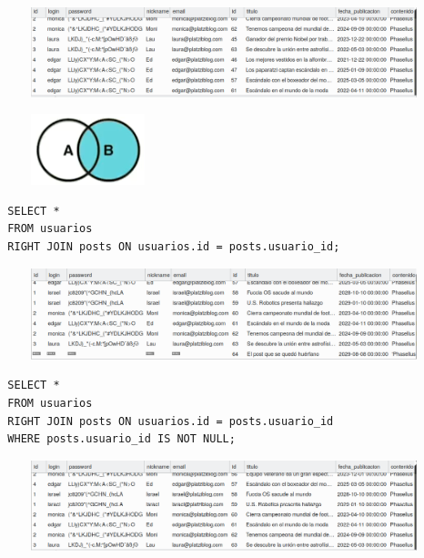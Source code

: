 \documentclass{article}
\begin{document}
\begin{figure}[h!]
  \centering
  \includegraphics[scale=0.75]{./Pictures/093_join_left_not_null.png}
\end{figure}


\begin{figure}[h!]
  \centering
  \includegraphics[scale=0.75]{./Pictures/091_join_right.png}
\end{figure}

\begin{verbatim}
  SELECT *
  FROM usuarios
  RIGHT JOIN posts ON usuarios.id = posts.usuario_id;
\end{verbatim}

\begin{figure}[h!]
  \centering
  \includegraphics[scale=0.75]{./Pictures/094_join_right.png}
\end{figure}


\begin{verbatim}
  SELECT *
  FROM usuarios
  RIGHT JOIN posts ON usuarios.id = posts.usuario_id
  WHERE posts.usuario_id IS NOT NULL;
\end{verbatim}

\begin{figure}[h!]
  \centering
  \includegraphics[scale=0.75]{./Pictures/095_join_right_not_null.png}
\end{figure}
\end{document}
